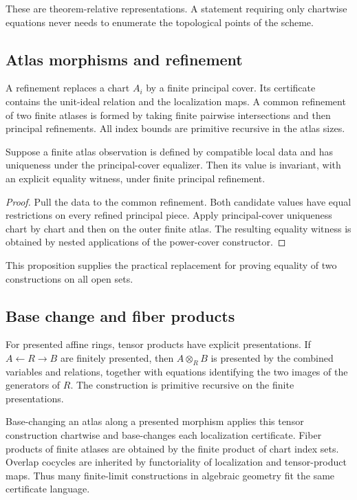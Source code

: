 These are theorem-relative representations.  A statement requiring only chartwise equations never
needs to enumerate the topological points of the scheme.

\subsection{Atlas morphisms and refinement}

A refinement replaces a chart $A_i$ by a finite principal cover.  Its certificate contains the
unit-ideal relation and the localization maps.  A common refinement of two finite atlases is formed
by taking finite pairwise intersections and then principal refinements.  All index bounds are
primitive recursive in the atlas sizes.

\begin{proposition}\label{prop:refinement-invariance}
Suppose a finite atlas observation is defined by compatible local data and has uniqueness under the
principal-cover equalizer.  Then its value is invariant, with an explicit equality witness, under
finite principal refinement.
\end{proposition}

\begin{proof}
Pull the data to the common refinement.  Both candidate values have equal restrictions on every
refined principal piece.  Apply principal-cover uniqueness chart by chart and then on the outer
finite atlas.  The resulting equality witness is obtained by nested applications of the power-cover
constructor.
\end{proof}

This proposition supplies the practical replacement for proving equality of two constructions on
all open sets.

\subsection{Base change and fiber products}

For presented affine rings, tensor products have explicit presentations.  If
$A\leftarrow R\to B$ are finitely presented, then $A\otimes_R B$ is presented by the combined
variables and relations, together with equations identifying the two images of the generators of
$R$.  The construction is primitive recursive on the finite presentations.

Base-changing an atlas along a presented morphism applies this tensor construction chartwise and
base-changes each localization certificate.  Fiber products of finite atlases are obtained by the
finite product of chart index sets.  Overlap cocycles are inherited by functoriality of localization
and tensor-product maps.  Thus many finite-limit constructions in algebraic geometry fit the same
certificate language.

